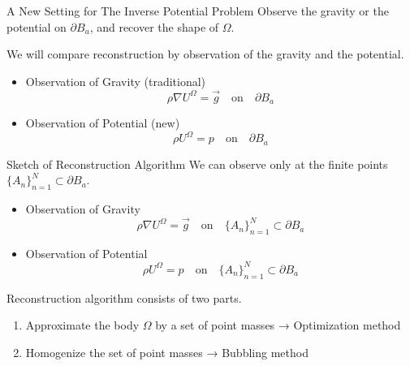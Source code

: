 \documentclass[dvipdfmx]{beamer}
\theoremstyle{remark}
\begin{document}
\begin{frame}{A New Setting for The Inverse Potential Problem}
  Observe the gravity or the potential on $\partial B_a$, and recover the shape of $\Omega$.
  \begin{figure}
    \centering
  \end{figure}

  We will compare reconstruction by observation of the gravity and the potential.
  \begin{itemize}
    \item Observation of Gravity (traditional)
    \[
      \rho\nabla U^{\Omega} = \overrightarrow{g} \quad \mathrm{on} \quad \partial B_a
    \]
  
    \item Observation of Potential (new)
    \[
      \rho U^{\Omega} = p \quad \mathrm{on} \quad \partial B_a
    \]
  \end{itemize}
\end{frame}


\begin{frame}{Sketch of Reconstruction Algorithm}
  We can observe only at the finite points $\{A_n\}_{n=1}^N\subset\partial B_a$.
  \begin{itemize}
    \item Observation of Gravity
    \[
      \rho\nabla U^{\Omega} = \overrightarrow{g} \quad \mathrm{on} \quad \{A_n\}_{n=1}^N\subset \partial B_a
    \]
  
    \item Observation of Potential
    \[
      \rho U^{\Omega} = p \quad \mathrm{on} \quad \{A_n\}_{n=1}^N\subset \partial B_a
    \]
  \end{itemize}

  Reconstruction algorithm consists of two parts.
  \begin{enumerate}
    \item Approximate the body $\Omega$ by a set of point masses → Optimization method
    \item Homogenize the set of point masses → Bubbling method
  \end{enumerate}
  \ 
\end{frame}
\end{document}

